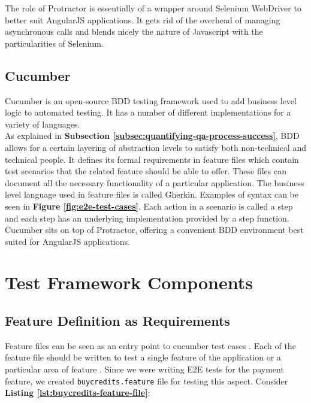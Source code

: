 The role of Protractor is essentially of a wrapper around Selenium WebDriver to better suit AngularJS applications. It gets rid of the overhead of managing asynchronous calls and blends nicely the nature of Javascript with the particularities of Selenium.

\subsection{Cucumber}
\label{subsec:cucumber}
Cucumber is an open-source BDD testing framework used to add business level logic to automated testing. It has a number of different implementations for a variety of languages. 
\\

As explained in \textbf{Subsection \ref{subsec:quantifying-qa-process-success}}, BDD allows for a certain layering of abstraction levels to satisfy both non-technical and technical people. It defines its formal requirements in feature files which contain test scenarios that the related feature should be able to offer. These files can document all the necessary functionality of a particular application. The business level language used in feature files is called Gherkin. Examples of syntax can be seen in \textbf{Figure \ref{fig:e2e-test-cases}}. Each action in a scenario is called a step and each step has an underlying implementation provided by a step function.
\\

Cucumber sits on top of Protractor, offering a convenient BDD environment best suited for AngularJS applications.


\section{Test Framework Components}
\label{sec:test-framework-components}

\subsection{Feature Definition as Requirements}
\label{subsec:feautre-definition-as-requirements}

Feature files can be seen as an entry point to cucumber test cases \cite{featurefile1}. Each of the feature file should be written to test a single feature of the application or a particular area of feature \cite{featurefile2}. Since we were writing E2E tests for the payment feature, we created \texttt{buycredits.feature} file for testing this aspect. Consider \textbf{Listing \ref{lst:buycredits-feature-file}}:\\

